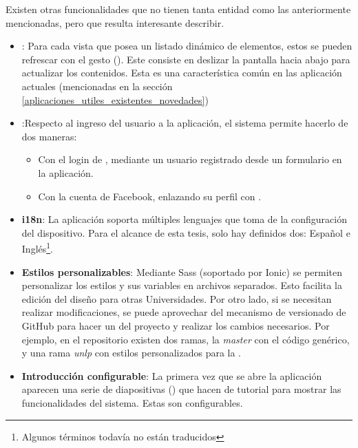 Existen otras funcionalidades que no tienen tanta entidad como las anteriormente mencionadas, pero que resulta interesante describir.

\begin{itemize}
\item \textbf{}: Para cada vista que posea un listado dinámico de elementos, estos se pueden refrescar con el gesto  (). Este consiste en deslizar la pantalla hacia abajo para actualizar los contenidos. Esta es una característica común en las aplicación actuales (mencionadas en la sección \ref{aplicaciones_utiles_existentes_novedades})

\item \textbf{}:Respecto al ingreso del usuario a la aplicación, el sistema permite hacerlo de dos maneras:
\begin{itemize}
\item Con el login de \nombreApp, mediante un usuario registrado desde un formulario en la aplicación.
\item Con la cuenta de Facebook, enlazando su perfil con \nombreApp.
\end{itemize}

\item \textbf{\gls{i18n}}: La aplicación soporta múltiples lenguajes que toma de la configuración del dispositivo. Para el alcance de esta tesis, solo hay definidos dos: Español e Inglés\footnote{Algunos términos todavía no están traducidos}. 

\item \textbf{Estilos personalizables}: Mediante Sass (soportado por Ionic) se permiten personalizar los estilos y sus variables en archivos separados. Esto facilita la edición del diseño para otras Universidades. Por otro lado, si se necesitan realizar modificaciones, se puede aprovechar del mecanismo de versionado de GitHub para hacer un  del proyecto y realizar los cambios necesarios. Por ejemplo, en el repositorio existen dos ramas, la \textit{master} con el código genérico, y una rama \textit{unlp} con estilos personalizados para la \unlp{}.

\item \textbf{Introducción configurable}: La primera vez que se abre la aplicación aparecen una serie de diapositivas () que hacen de tutorial para mostrar las funcionalidades del sistema. Estas son configurables.

\end{itemize}




